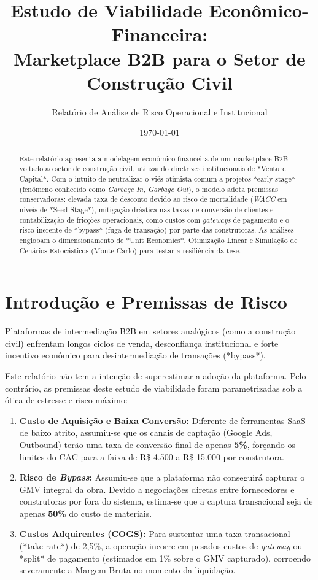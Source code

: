 \documentclass[a4paper,12pt]{article}
\title{\textbf{Estudo de Viabilidade Econômico-Financeira:\\Marketplace B2B para o Setor de Construção Civil}}
\author{Relatório de Análise de Risco Operacional e Institucional}
\date{\today}
\begin{document}
\maketitle
\begin{abstract}
Este relatório apresenta a modelagem econômico-financeira de um marketplace B2B voltado ao setor de construção civil, utilizando diretrizes institucionais de *Venture Capital*. Com o intuito de neutralizar o viés otimista comum a projetos *early-stage* (fenômeno conhecido como \textit{Garbage In, Garbage Out}), o modelo adota premissas conservadoras: elevada taxa de desconto devido ao risco de mortalidade (\textit{WACC} em níveis de *Seed Stage*), mitigação drástica nas taxas de conversão de clientes e contabilização de fricções operacionais, como custos com \textit{gateways} de pagamento e o risco inerente de *bypass* (fuga de transação) por parte das construtoras. As análises englobam o dimensionamento de *Unit Economics*, Otimização Linear e Simulação de Cenários Estocásticos (Monte Carlo) para testar a resiliência da tese.
\end{abstract}

\tableofcontents
\newpage

\section{Introdução e Premissas de Risco}

Plataformas de intermediação B2B em setores analógicos (como a construção civil) enfrentam longos ciclos de venda, desconfiança institucional e forte incentivo econômico para desintermediação de transações (*bypass*). 

Este relatório não tem a intenção de superestimar a adoção da plataforma. Pelo contrário, as premissas deste estudo de viabilidade foram parametrizadas sob a ótica de estresse e risco máximo:
\begin{enumerate}
    \item \textbf{Custo de Aquisição e Baixa Conversão:} Diferente de ferramentas SaaS de baixo atrito, assumiu-se que os canais de captação (Google Ads, Outbound) terão uma taxa de conversão final de apenas \textbf{5\%}, forçando os limites do CAC para a faixa de R\$ 4.500 a R\$ 15.000 por construtora.
    \item \textbf{Risco de \textit{Bypass}:} Assumiu-se que a plataforma não conseguirá capturar o GMV integral da obra. Devido a negociações diretas entre fornecedores e construtoras por fora do sistema, estima-se que a captura transacional seja de apenas \textbf{50\%} do custo de materiais.
    \item \textbf{Custos Adquirentes (COGS):} Para sustentar uma taxa transacional (*take rate*) de 2,5\%, a operação incorre em pesados custos de \textit{gateway} ou *split* de pagamento (estimados em 1\% sobre o GMV capturado), corroendo severamente a Margem Bruta no momento da liquidação.
\end{enumerate}
\end{document}
